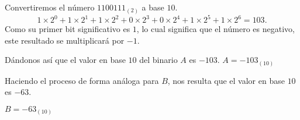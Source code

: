 \begin{frame}
\begin{solution}
\begin{enumerate}[a)]
                    Convertiremos el número ${1100111}_{\left(2\right)}$ a base $10$.
                    \begin{equation*}
                    1\times 2^{0}+
                    1\times2^{1}+
                    1\times2^{2}+
                    0\times2^{3}+
                    0\times2^{4}+
                    1\times2^{5}+
                    1\times2^{6}=
                    103.
                    \end{equation*}
                    Como su primer bit significativo es $1$, lo cual significa que el número es negativo, este resultado se multiplicará por $-1$.

                    Dándonos así que el valor en base $10$ del binario $A$ es $-103$. $A=-{103}_{\left(10\right)}$

                    Haciendo el proceso de forma análoga para $B$, nos resulta que el valor en base $10$ es $-63$.

                    $B=-{63}_{\left(10\right)}$
		\end{enumerate}
	\end{solution}
\end{frame}

